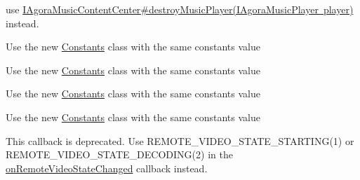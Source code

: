 \begin{DoxyRefList}
%
use \mbox{\hyperlink{classio_1_1agora_1_1musiccontentcenter_1_1_i_agora_music_content_center_ab2e9dd0e7daac8921f233275cf30a9ff}{I\+Agora\+Music\+Content\+Center\#destroy\+Music\+Player(\+I\+Agora\+Music\+Player player)}} instead.  
\item[Class \mbox{\hyperlink{classio_1_1agora_1_1rtc2_1_1_i_rtc_engine_event_handler_1_1_quality}{io.agora.rtc2.I\+Rtc\+Engine\+Event\+Handler.Quality}} ]\label{deprecated__deprecated000003}%
%
Use the new \mbox{\hyperlink{classio_1_1agora_1_1rtc2_1_1_constants}{Constants}} class with the same constants value  
\item[Class \mbox{\hyperlink{classio_1_1agora_1_1rtc2_1_1_i_rtc_engine_event_handler_1_1_video_profile}{io.agora.rtc2.I\+Rtc\+Engine\+Event\+Handler.Video\+Profile}} ]\label{deprecated__deprecated000004}%
%
Use the new \mbox{\hyperlink{classio_1_1agora_1_1rtc2_1_1_constants}{Constants}} class with the same constants value  
\item[Class \mbox{\hyperlink{classio_1_1agora_1_1rtc2_1_1_i_rtc_engine_event_handler_1_1_client_role}{io.agora.rtc2.I\+Rtc\+Engine\+Event\+Handler.Client\+Role}} ]\label{deprecated__deprecated000005}%
%
Use the new \mbox{\hyperlink{classio_1_1agora_1_1rtc2_1_1_constants}{Constants}} class with the same constants value  
\item[Class \mbox{\hyperlink{classio_1_1agora_1_1rtc2_1_1_i_rtc_engine_event_handler_1_1_user_offline_reason}{io.agora.rtc2.I\+Rtc\+Engine\+Event\+Handler.User\+Offline\+Reason}} ]\label{deprecated__deprecated000006}%
%
Use the new \mbox{\hyperlink{classio_1_1agora_1_1rtc2_1_1_constants}{Constants}} class with the same constants value  
\item[Member \mbox{\hyperlink{classio_1_1agora_1_1rtc2_1_1_i_rtc_engine_event_handler_ab63e6aa894c685a766fc6e81711c68e6}{io.agora.rtc2.I\+Rtc\+Engine\+Event\+Handler.on\+First\+Remote\+Video\+Decoded}} (int uid, int width, int height, int elapsed)]\label{deprecated__deprecated000007}%
%
 This callback is deprecated. Use {\ttfamily R\+E\+M\+O\+T\+E\+\_\+\+V\+I\+D\+E\+O\+\_\+\+S\+T\+A\+T\+E\+\_\+\+S\+T\+A\+R\+T\+I\+N\+G(1)} or {\ttfamily R\+E\+M\+O\+T\+E\+\_\+\+V\+I\+D\+E\+O\+\_\+\+S\+T\+A\+T\+E\+\_\+\+D\+E\+C\+O\+D\+I\+N\+G(2)} in the \mbox{\hyperlink{classio_1_1agora_1_1rtc2_1_1_i_rtc_engine_event_handler_a5daae97f78becbf71dc3dbfd494f8419}{on\+Remote\+Video\+State\+Changed}} callback instead. 

\end{DoxyRefList}
